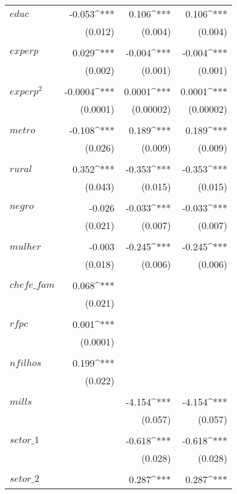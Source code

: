 \begin{apendicesenv}
\begin{longtable}{@{\extracolsep{5pt}}lD{.}{.}{-3} D{.}{.}{-3} D{.}{.}{-3} }
	  $educ$ & -0.053^{***} & 0.106^{***} & 0.106^{***} \\ 
	  & (0.012) & (0.004) & (0.004) \\ 
	  & & & \\ 
	 $experp$ & 0.029^{***} & -0.004^{***} & -0.004^{***} \\ 
	  & (0.002) & (0.001) & (0.001) \\ 
	  & & & \\ 
	 $experp^{2}$ & -0.0004^{***} & 0.0001^{***} & 0.0001^{***} \\ 
	  & (0.0001) & (0.00002) & (0.00002) \\ 
	  & & & \\ 
	 $metro$ & -0.108^{***} & 0.189^{***} & 0.189^{***} \\ 
	  & (0.026) & (0.009) & (0.009) \\ 
	  & & & \\ 
	 $rural$ & 0.352^{***} & -0.353^{***} & -0.353^{***} \\ 
	  & (0.043) & (0.015) & (0.015) \\ 
	  & & & \\ 
	 $negro$ & -0.026 & -0.033^{***} & -0.033^{***} \\ 
	  & (0.021) & (0.007) & (0.007) \\ 
	  & & & \\ 
	 $mulher$ & -0.003 & -0.245^{***} & -0.245^{***} \\ 
	  & (0.018) & (0.006) & (0.006) \\ 
	  & & & \\ 
	 $chefe\_fam$ & 0.068^{***} &  &  \\ 
	  & (0.021) &  &  \\ 
	  & & & \\ 
	 $rfpc$ & 0.001^{***} &  &  \\ 
	  & (0.0001) &  &  \\ 
	  & & & \\ 
	 $nfilhos$ & 0.199^{***} &  &  \\ 
	  & (0.022) &  &  \\ 
	  & & & \\ 
	 $mills$ &  & -4.154^{***} & -4.154^{***} \\ 
	  &  & (0.057) & (0.057) \\ 
	  & & & \\ 
	 $setor\_1$ &  & -0.618^{***} & -0.618^{***} \\ 
	  &  & (0.028) & (0.028) \\ 
	  & & & \\ 
	 $setor\_2$ &  & 0.287^{***} & 0.287^{***} \\ 

\end{longtable}
\end{apendicesenv}
